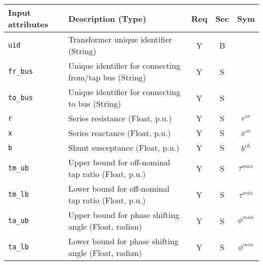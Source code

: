 \documentclass{article}
\begin{document}
\begin{center}
\small
\begin{tabular}{ l | l | c | c | c |}
Input attributes & Description (Type) & Req & Sec & Sym\\
\hline
  {\tt uid} & Transformer unique identifier (String)& Y & B & \\
  {\tt fr\_bus} & Unique identifier for connecting from/tap bus (String)& Y & S & \\
  {\tt to\_bus} & Unique identifier for connecting to bus (String)& Y & S & \\
  {\tt r} & Series resistance (Float, p.u.)& Y & S & $r^{sr}$\\
  {\tt x} & Series reactance  (Float, p.u.)& Y & S & $x^{sr}$\\
  {\tt b} & Shunt susceptance (Float, p.u.)& Y & S & $b^{ch}$ \\
  {\tt tm\_ub} & Upper bound for off-nominal tap ratio (Float, p.u.)& Y & S & $\tau^{max}$\\
  {\tt tm\_lb} & Lower bound for off-nominal tap ratio (Float, p.u.)& Y & S & $\tau^{min}$\\
  {\tt ta\_ub} & Upper bound for phase shifting angle (Float, radian)& Y & S & $\phi^{max}$\\
  {\tt ta\_lb} & Lower bound for phase shifting angle (Float, radian)& Y & S & $\phi^{min}$\\

\end{tabular}
\end{center}
\end{document}
